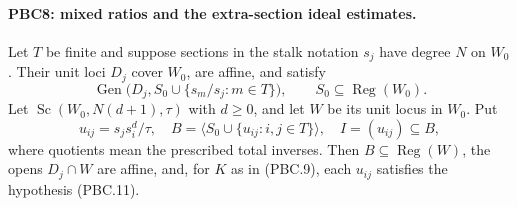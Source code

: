 \documentclass[11pt,a4paper]{article}
\numberwithin{equation}{section}
\theoremstyle{remark}\newtheorem{remark}[theorem]{Remark}
\begin{document}
\paragraph{PBC8: mixed ratios and the extra-section ideal estimates.}
\label{claim:PBC8}
Let $T$ be finite and suppose sections in the stalk notation
$s_j$ have degree $N$ on $W_0$.  Their unit loci $D_j$ cover
$W_0$, are affine, and satisfy
\[
 \operatorname{Gen}\bigl(D_j,S_0\cup\{s_m/s_j:m\in T\}\bigr),
 \qquad S_0\subseteq\operatorname{Reg}(W_0).
                                                        \tag{PBC.14}
\]
Let $\operatorname{Sc}(W_0,N(d+1),\tau)$ with $d\ge0$, and
let $W$ be its unit locus in $W_0$.  Put
\[
 u_{ij}=s_j s_i^d/\tau,\quad
 B=\langle S_0\cup\{u_{ij}:i,j\in T\}\rangle,\quad
 I=(u_{ij})\subseteq B,
                                                        \tag{PBC.15}
\]
where quotients mean the prescribed total inverses.
Then $B\subseteq\operatorname{Reg}(W)$, the opens
$D_j\cap W$ are affine, and, for $K$ as in (PBC.9),
each $u_{ij}$ satisfies the hypothesis (PBC.11).
\end{document}
